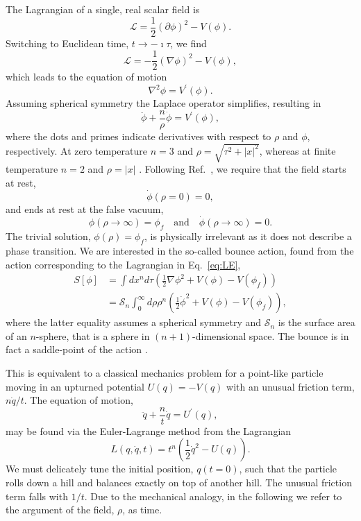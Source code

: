 \documentclass[final,3p,11pt,pdflatex]{elsarticle}
\renewcommand{\tfrac}{\frac}
\renewcommand{\refeq}[1]{Eq.~\ref{#1}}
\newcommand{\refcite}[1]{Ref.~\cite{#1}}
\newcommand{\fv}{\ensuremath{\phi_f}}
\begin{document}
The Lagrangian of a single, real scalar field is
\begin{equation}
\mathcal{L} = \tfrac12 (\partial\phi)^2 - V(\phi).
\end{equation}
Switching to Euclidean time, $t \to -\imath \tau$, we find
\begin{equation}\label{eq:LE}
\mathcal{L} = -\tfrac12 (\nabla\phi)^2 - V(\phi),
\end{equation}
which leads to the equation of motion
\begin{equation}
\nabla^2 \phi = V^\prime(\phi).
\end{equation}
Assuming spherical symmetry the Laplace operator simplifies, resulting in
\begin{equation}\label{eq:one_dim_bounce}
\ddot \phi + \tfrac{n}{\rho}\dot\phi = V^\prime(\phi),
\end{equation}
where the dots and primes indicate derivatives with respect to $\rho$ and
$\phi$, respectively.  At zero temperature $n=3$ and
$\rho = \sqrt{\tau^2 + |x|^2}$, whereas at finite temperature $n=2$ and
$\rho = |x|$ \cite{Linde:1981zj}.
Following \refcite{Coleman:1977py}, we require that the field starts at rest,
\begin{equation}\label{eq:bcon1}
\dot\phi(\rho = 0) = 0,
\end{equation}
and ends at rest at the false vacuum,
\begin{equation}\label{eq:bcon2}
\phi(\rho \to \infty) = \fv \quad\text{and}\quad \dot\phi(\rho \to \infty) = 0.
\end{equation}
The trivial solution, $\phi(\rho) = \fv$, is physically irrelevant as it does not describe a phase transition.  We are interested in the so-called bounce action, found from the action corresponding to the Lagrangian in \refeq{eq:LE},
\begin{align}\label{eq:action}
S[\phi] &= \int dx^n d\tau \left(\tfrac12\nabla\phi^2 + V(\phi) - V(\fv) \right)\\
        &= \mathcal{S}_n \int_0^\infty d\rho \rho^n \left(\tfrac12\dot\phi^2 + V(\phi) - V(\fv) \right),
\end{align}
where the latter equality assumes a spherical symmetry and $\mathcal{S}_n$ is the surface area of an $n$-sphere, that is a sphere in $(n+1)$-dimensional space.  The bounce is in fact a saddle-point of the action \cite{Coleman:1987rm}.

This is equivalent to a classical mechanics problem for a point-like particle moving in an upturned potential $U(q) = -V(q)$ with an unusual friction term, $n\dot q/t$.  The equation of motion,
\begin{equation}
   \ddot q + \tfrac{n}{t}\dot q = U^\prime(q),
\end{equation}
may be found via the Euler-Lagrange method from the Lagrangian
\begin{equation}
    L(q, \dot q, t) = t^n \left(\tfrac12\dot q^2 - U(q)\right).
\end{equation}
We must delicately tune the initial position, $q(t=0)$, such that the particle rolls down a hill and balances exactly on top of another hill.  The unusual friction term falls with $1/t$.
%
Due to the mechanical analogy, in the following we refer to the argument of the field, $\rho$, as time.
\end{document}
